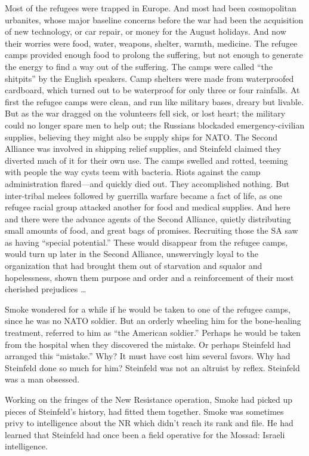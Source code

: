 Most of the refugees were trapped in Europe. And most had been cosmopolitan urbanites, whose major baseline concerns before the war had been the acquisition of new technology, or car repair, or money for the August holidays. And now their worries were food, water, weapons, shelter, warmth, medicine. The refugee camps provided enough food to prolong the suffering, but not enough to generate the energy to find a way out of the suffering. The camps were called “the shitpits” by the English speakers. Camp shelters were made from waterproofed cardboard, which turned out to be waterproof for only three or four rainfalls. At first the refugee camps were clean, and run like military bases, dreary but livable. But as the war dragged on the volunteers fell sick, or lost heart; the military could no longer spare men to help out; the Russians blockaded emergency-civilian supplies, believing they might also be supply ships for NATO. The Second Alliance was involved in shipping relief supplies, and Steinfeld claimed they diverted much of it for their own use. The camps swelled and rotted, teeming with people the way cysts teem with bacteria. Riots against the camp administration flared—and quickly died out. They accomplished nothing. But inter-tribal melees followed by guerrilla warfare became a fact of life, as one refugee racial group attacked another for food and medical supplies. And here and there were the advance agents of the Second Alliance, quietly distributing small amounts of food, and great bags of promises. Recruiting those the SA saw as having “special potential.” These would disappear from the refugee camps, would turn up later in the Second Alliance, unswervingly loyal to the organization that had brought them out of starvation and squalor and hopelessness, shown them purpose and order and a reinforcement of their most cherished prejudices …

Smoke wondered for a while if he would be taken to one of the refugee camps, since he was no NATO soldier. But an orderly wheeling him for the bone-healing treatment, referred to him as “the American soldier.” Perhaps he would be taken from the hospital when they discovered the mistake. Or perhaps Steinfeld had arranged this “mistake.” Why? It must have cost him several favors. Why had Steinfeld done so much for him? Steinfeld was not an altruist by reflex. Steinfeld was a man obsessed.

Working on the fringes of the New Resistance operation, Smoke had picked up pieces of Steinfeld’s history, had fitted them together. Smoke was sometimes privy to intelligence about the NR which didn’t reach its rank and file. He had learned that Steinfeld had once been a field operative for the Mossad: Israeli intelligence.

